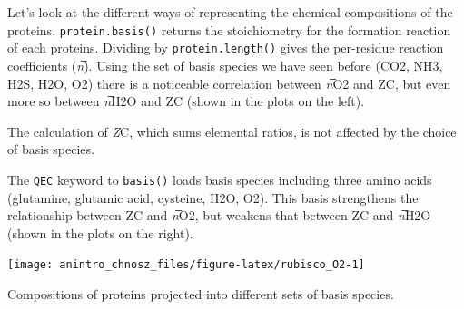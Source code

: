 \documentclass[]{tufte-handout}
\begin{document}
Let's look at the different ways of representing the chemical
compositions of the proteins. {\texttt{protein.basis()}} returns the
stoichiometry for the formation reaction of each proteins. Dividing by
{\texttt{protein.length()}} gives the per-residue reaction coefficients
(\emph{n}̅). Using the set of basis species we have seen before (CO2,
NH3, H2S, H2O, O2) there is a noticeable correlation between \emph{n}̅O2
and ZC, but even more so between \emph{n}̅H2O and ZC (shown in the plots
on the left).

\begin{marginfigure}
The calculation of \emph{Z}C, which sums elemental ratios, is not
affected by the choice of basis species.
\end{marginfigure}

The \texttt{QEC} keyword to {\texttt{basis()}} loads basis species
including three amino acids (glutamine, glutamic acid, cysteine, H2O,
O2). This basis strengthens the relationship between ZC and \emph{n}̅O2,
but weakens that between ZC and \emph{n}̅H2O (shown in the plots on the
right).

\begin{marginfigure}
\texttt{[image: anintro\_chnosz\_files/figure-latex/rubisco\_O2-1]} \caption[Compositions of proteins projected into different sets of basis species]{Compositions of proteins projected into different sets of basis species.}\label{fig:rubisco_O2}
\end{marginfigure}
\end{document}
